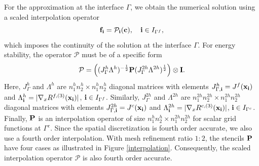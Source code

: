 {{For the approximation at the interface $\Gamma$, we obtain the numerical solution using a scaled interpolation operator
\begin{equation}\label{continuous_sol}
{\bf f}_{\bf i} = {\mathcal{P}}_{\bf i}({\bf c}),\quad {\bf i}\in I_{\Gamma^f},
\end{equation}
which imposes the continuity of the solution at the interface $\Gamma$. 
For energy stability, the operator ${\mathcal{P}}$ must be of a specific form
\begin{equation}\label{scaleP}
{\mathcal{P}} = \left(({J}^h_\Gamma {\Lambda}^h)^{-\frac{1}{2}}{\bf P}({J}^{2h}_\Gamma {\Lambda}^{2h})^{\frac{1}{2}}\right)\otimes{\bf I}.
\end{equation}
Here, $J_{\Gamma}^h$ and $\Lambda^h$ are $n_1^{h}n_2^{h}\times n_1^{h}n_2^{h}$ diagonal matrices with elements $J_{\Gamma,{\bf i}}^h = J^f({\bf x}_{\bf i})$ and $\Lambda_{\bf i}^h = |\nabla_xR^{f,(3)}({\bf x}_{\bf i})|$, ${\bf i}\in I_{\Gamma^f}$. Similarly, ${J}_{\Gamma}^{2h}$ and ${{\Lambda}^{2h}}$ are $n_1^{2h}n_2^{2h}\times n_1^{2h}n_2^{2h}$ diagonal matrices with elements $J_{\Gamma,{\bf i}}^{2h} = J^c({\bf x}_{\bf i})$ and $\Lambda_{\bf i}^{2h} = |\nabla_xR^{c,(3)}({\bf x}_{\bf i})|$, ${\bf i}\in I_{\Gamma^c}$. Finally, ${\bf P}$ is an interpolation operator of size $n_1^hn_2^h\times n_1^{2h}n_2^{2h}$ for scalar grid functions at $\Gamma^c$. Since the spatial discretization is fourth order accurate, we also use a fourth order interpolation. With mesh refinement ratio  $1:2$, the stencils ${\bf P}$ have four cases as illustrated in  Figure \ref{interpolation}. Consequently, the scaled interpolation operator $\mathcal{P}$ is also fourth order accurate.

}}

